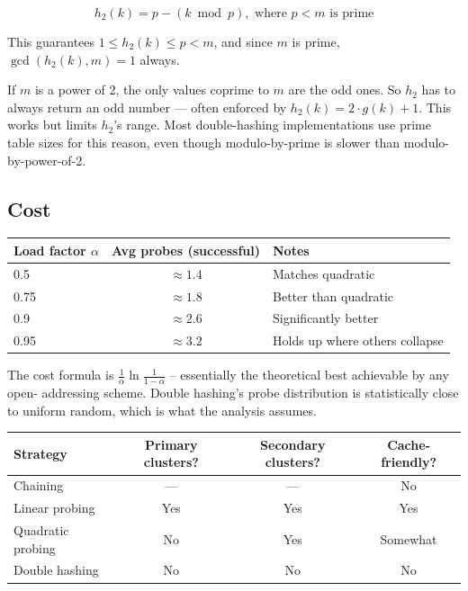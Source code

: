 \documentclass[11pt]{article}
\begin{document}
$$h_2(k) = p - (k \bmod p), \text{ where } p < m \text{ is prime}$$

This guarantees $1 \leq h_2(k) \leq p < m$, and since $m$ is
prime, $\gcd(h_2(k), m) = 1$ always.

\begin{warnbox}
If $m$ is a power of 2, the only values coprime to $m$ are the
odd ones. So $h_2$ has to always return an odd number --- often
enforced by $h_2(k) = 2 \cdot g(k) + 1$. This works but limits
$h_2$'s range. Most double-hashing implementations use prime
table sizes for this reason, even though modulo-by-prime is
slower than modulo-by-power-of-2.
\end{warnbox}

\subsection*{Cost}

\begin{center}
\begin{tabular}{|l|c|l|}
\hline
\textbf{Load factor $\alpha$} & \textbf{Avg probes (successful)} & \textbf{Notes} \\
\hline
0.5  & $\approx 1.4$   & Matches quadratic \\
0.75 & $\approx 1.8$   & Better than quadratic \\
0.9  & $\approx 2.6$   & Significantly better \\
0.95 & $\approx 3.2$   & Holds up where others collapse \\
\hline
\end{tabular}
\end{center}

The cost formula is $\frac{1}{\alpha} \ln \frac{1}{1-\alpha}$ --
essentially the theoretical best achievable by any open-
addressing scheme. Double hashing's probe distribution is
statistically close to uniform random, which is what the analysis
assumes.

\begin{center}
\begin{tabular}{|l|c|c|c|}
\hline
\textbf{Strategy} & \textbf{Primary clusters?} & \textbf{Secondary clusters?} & \textbf{Cache-friendly?} \\
\hline
Chaining          & ---  & ---  & No \\
Linear probing    & Yes  & Yes  & Yes \\
Quadratic probing & No   & Yes  & Somewhat \\
Double hashing    & No   & No   & No \\
\hline
\end{tabular}
\end{center}
\end{document}
